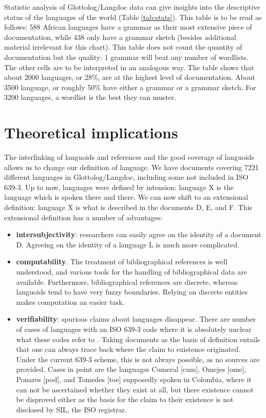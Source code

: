 \documentclass[10pt, a4paper]{article}
\begin{document}
Statistic analysis of Glottolog/Langdoc data can give insights into the descriptive status of the languages of the world (Table \ref{tab:stats}). This table is to be read as follows: 588 African languages have a grammar as their most extensive piece of documentation, while 438 only have a grammar sketch (besides additional material irrelevant for this chart). This table does not count the quantity of documentation but the quality: 1 grammar will beat any number of wordlists.  The other cells are to be interpreted in an analogous way. The table shows that about 2000 languages, or 28\%, are at the highest level of documentation. About 3500 language, or roughly 50\% have either a grammar or a grammar sketch. For 3200 languages, a wordlist is the best they can muster.

\section{Theoretical implications}

The interlinking of languoids and references and the good coverage of languoids allows us to change our definition of language. We have documents covering 7221 different languages in Glottolog/Langdoc, including some not included in ISO 639-3.   Up to now, languages were defined by intension: language X is the language which is spoken there and there. We can now shift to an extensional definition: language X is what is described in the documents D, E, and F. This extensional definition has a number of advantages:

\begin{itemize}
 \item \textbf{intersubjectivity}: researchers can easily agree on the identity of a document D. Agreeing on the identity of a language L is much more complicated.
 \item \textbf{computability}. The treatment of bibliographical references is well understood, and various tools for the handling of bibliographical data are available. Furthermore, bibliographical references are discrete, whereas languoids tend to have very fuzzy boundaries. Relying on discrete entities makes computation an easier task.
 \item \textbf{verifiability}: spurious claims about languages disappear. There are  number of cases of languages with an ISO 639-3 code where it is absolutely unclear what these codes refer to \cite{NordhoffEtAl2011iswc}. Taking documents as the basis of definition entails that one can always trace back where the claim to existence originated. Under the current 639-3 scheme, this is not always possible, as no sources are provided. Cases in point are the languages Cumeral [cum], Omejes  [ome], Ponares  [pod], and Tomedes  [toe]  supposedly spoken in Colombia, where it can not be ascertained whether they exist at all, but there existence cannot be disproved either as the basis for the claim to their existence is not disclosed by SIL, the ISO registrar.
\end{itemize}
\end{document}
